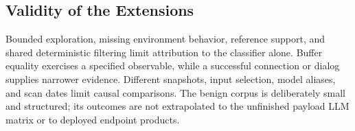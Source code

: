 \subsection{Validity of the Extensions}\label{sec:extension_limits}
Bounded exploration, missing environment behavior, reference support,
and shared deterministic filtering limit attribution to the classifier
alone. Buffer equality exercises a specified observable, while a
successful connection or dialog supplies narrower evidence. Different
snapshots, input selection, model aliases, and scan dates limit causal
comparisons. The benign corpus is deliberately small and structured;
its outcomes are not extrapolated to the unfinished payload LLM
matrix or to deployed endpoint products.
